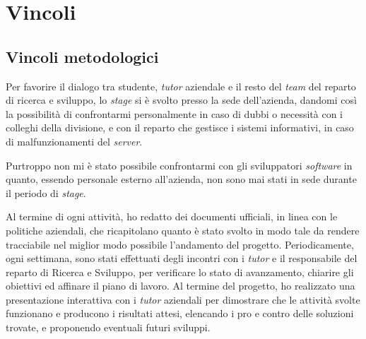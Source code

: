 \section{Vincoli}
\subsection{Vincoli metodologici}
Per favorire il dialogo tra studente, \textit{tutor} aziendale e il resto del \textit{team} del reparto di ricerca e sviluppo, lo \textit{stage} si è svolto presso la sede dell'azienda, dandomi così la possibilità di confrontarmi personalmente in caso di dubbi o necessità con i colleghi della divisione, e con il reparto che gestisce i sistemi informativi, in caso di malfunzionamenti del \textit{server}.

Purtroppo non mi è stato possibile confrontarmi con gli sviluppatori \textit{software} in quanto, essendo personale esterno all'azienda, non sono mai stati in sede durante il periodo di \textit{stage}.

Al termine di ogni attività, ho redatto dei documenti ufficiali, in linea con le politiche aziendali, che ricapitolano quanto è stato svolto in modo tale da rendere tracciabile nel miglior modo possibile l'andamento del progetto. Periodicamente, ogni settimana, sono stati effettuati degli incontri con i \textit{tutor} e il responsabile del reparto di Ricerca e Sviluppo, per verificare lo stato di avanzamento, chiarire gli obiettivi ed affinare il piano di lavoro. Al termine del progetto, ho realizzato una presentazione interattiva con i \textit{tutor} aziendali per dimostrare che le attività svolte funzionano e producono i risultati attesi, elencando i pro e contro delle soluzioni trovate, e proponendo eventuali futuri sviluppi.

